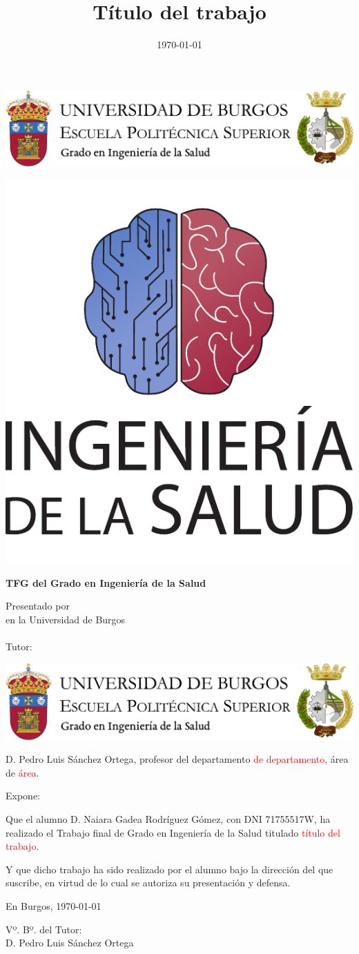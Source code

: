 \documentclass[a4paper,12pt,twoside]{memoir}
\title{Título del trabajo}
\author{\nombre}
\date{\today}
\makeatletter
\def\maketitle{
  \null
  \thispagestyle{empty}
\begin{center}
  \noindent\includegraphics[width=\textwidth]{cabeceraSalud}\vspace{1.5cm}%
\end{center}
  
  \begin{center}
    \begin{minipage}[c][1.5cm][c]{.20\textwidth}
        \includegraphics[width=\textwidth]{escudoSalud.pdf}
    \end{minipage}
  \end{center}
  
  \begin{center}
    \colorbox{cpardoBox}{%
        \begin{minipage}{.8\textwidth}
          \vspace{.5cm}\Large
          \begin{center}
          \textbf{TFG del Grado en Ingeniería de la Salud}\vspace{.6cm}\\
          \textbf{\LARGE\@title{}}
          \end{center}
          \vspace{.2cm}
        \end{minipage}
    }%
  \end{center}
  
  \begin{center}%
  {%
    \noindent\LARGE
    Presentado por \@author{}\\ 
    en la Universidad de Burgos\\
    \vspace{0.5cm}
    \noindent\Large
    \@date{}\\
    \vspace{0.5cm}
    Tutor: \@tutor{}\\ %
  }%
  \end{center}%
  \null
  \cleardoublepage
  }
\newcommand{\nombre}{Naiara Gadea Rodríguez Gómez}
\newcommand{\nombreTutor}{Pedro Luis Sánchez Ortega}
\newcommand{\nombreTutorb}{Tutor 2}
\newcommand{\dni}{71755517W}
\makeatother
\begin{document}
\maketitle


\newpage\null\thispagestyle{empty}\newpage

\thispagestyle{empty}


\noindent\includegraphics[width=\textwidth]{cabeceraSalud}\vspace{1cm}

\noindent D. \nombreTutor, profesor del departamento \textcolor{red}{de departamento}, área de \textcolor{red}{área}.

\noindent Expone:

\noindent Que el alumno D. \nombre, con DNI \dni, ha realizado el Trabajo final de Grado en Ingeniería de la Salud titulado \textcolor{red}{título del trabajo}. 

\noindent Y que dicho trabajo ha sido realizado por el alumno bajo la dirección del que suscribe, en virtud de lo cual se autoriza su presentación y defensa.

\begin{center} %
En Burgos, {\large \today}
\end{center}

\vfill\vfill\vfill

\begin{minipage}{0.45\textwidth}
\begin{flushleft} %
Vº. Bº. del Tutor:\\[2cm]
D. \nombreTutor
\end{flushleft}
\end{minipage}
\hfill
\hfill

\vfill

\end{document}
